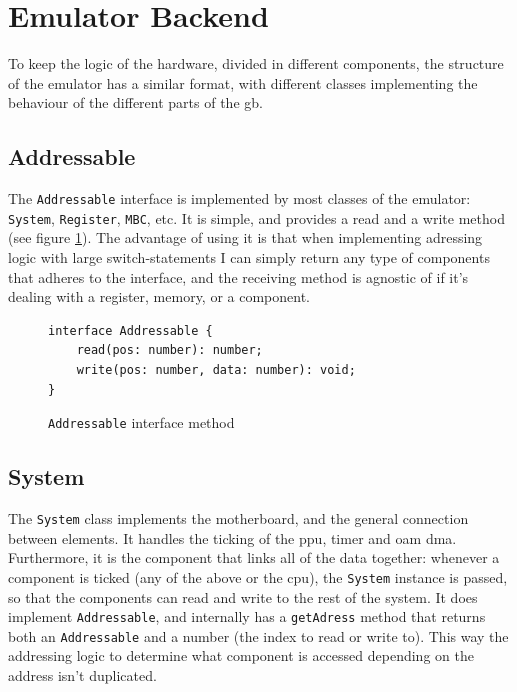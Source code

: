 \documentclass[11pt]{report}
\begin{document}
\section{Emulator Backend}

To keep the logic of the hardware, divided in different components, the structure of the emulator has a similar format, with different classes implementing the behaviour of the different parts of the \glsdesc{gb}.

\subsection{Addressable}

The \texttt{Addressable} interface is implemented by most classes of the emulator: \texttt{System}, \texttt{Register}, \texttt{MBC}, etc. It is simple, and provides a read and a write method (see figure \ref{fig:addressable}). The advantage of using it is that when implementing adressing logic with large switch-statements I can simply return any type of components that adheres to the interface, and the receiving method is agnostic of if it's dealing with a register, memory, or a component.

\begin{figure}[h]
    \begin{verbatim}
interface Addressable {
    read(pos: number): number;
    write(pos: number, data: number): void;
}
    \end{verbatim}
    \caption{\texttt{Addressable} interface method}
    \label{fig:addressable}
\end{figure}

\subsection{System}

The \texttt{System} class implements the motherboard, and the general connection between elements. It handles the ticking of the \gls{ppu}, timer and \gls{oam} \gls{dma}. Furthermore, it is the component that links all of the data together: whenever a component is ticked (any of the above or the \gls{cpu}), the \texttt{System} instance is passed, so that the components can read and write to the rest of the system. It does implement \texttt{Addressable}, and internally has a \texttt{getAdress} method that returns both an \texttt{Addressable} and a number (the index to read or write to). This way the addressing logic to determine what component is accessed depending on the address isn't duplicated.
\end{document}
